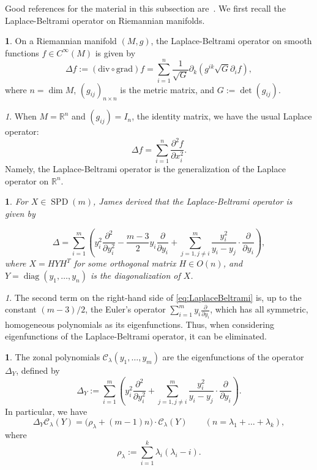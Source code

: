 \documentclass{mathincs}
\numberwithin{equation}{section}
\numberwithin{figure}{section}
\theoremstyle{plain}
\theoremstyle{definition}
\newtheorem{defn}[thm]{\protect\definitionname}
\theoremstyle{remark}
\newtheorem{rem}[thm]{\protect\remarkname}
\theoremstyle{plain}
\newtheorem{prop}[thm]{\protect\propositionname}
\theoremstyle{definition}
\theoremstyle{plain}
\theoremstyle{plain}
\DeclareMathOperator{\diag}{diag}
\newcommand{\SPD}{\operatorname{SPD}}
\providecommand{\definitionname}{Definition}
\providecommand{\propositionname}{Proposition}
\providecommand{\remarkname}{Remark}
\begin{document}
Good references for the material in this subsection are~\cite{Helgason,James1,Moakher}.
We first recall the Laplace-Beltrami operator on Riemannian manifolds.
\begin{defn}
On a Riemannian manifold $(M,g)$, the Laplace-Beltrami
operator on smooth functions $f\in C^{\infty}(M)$ is given by 
\[
\Delta f:=(\mathrm{div}\circ\mathrm{grad})f=\sum_{i=1}^{n}\frac{1}{\sqrt{G}}\partial_{k}\left(g^{ik}\sqrt{G}\partial_{i}f\right),
\]
where $n=\dim M$, $(g_{ij})_{n\times n}$ is the metric
matrix, and $G:=\det(g_{ij})$. 
\end{defn}
\begin{rem}
When $M=\mathbb{R}^{n}$ and $(g_{ij})=I_{n}$, the identity
matrix, we have the usual Laplace operator:
\[
\Delta f=\sum_{i=1}^{n}\frac{\partial^{2}f}{\partial x_{i}^{2}}.
\]
Namely, the Laplace-Beltrami operator is the generalization of the Laplace
operator on $\mathbb{R}^{n}$. 
\end{rem}
\begin{prop}
For $X\in \SPD(m)$, James \cite[eq.~3.12]{James1} derived
that the Laplace-Beltrami operator is given by

\begin{equation}
\Delta=\sum_{i=1}^{m}\left(y_{i}^{2}\frac{\partial^{2}}{\partial y_{i}^{2}}-\frac{m-3}{2}y_{i}\frac{\partial}{\partial y_{i}}+\sum_{j=1,j\neq i}^{m}\frac{y_{i}^{2}}{y_{i}-y_{j}}\cdot\frac{\partial}{\partial y_{i}}\right), \label{eq:LaplaceBeltrami}
\end{equation}
where $X=HY\!H^{T}$ for some orthogonal matrix $H\!\!\in\! O(n)$, and $Y\!\!=\!\diag(y_{1},\ldots,y_{n})$ is the diagonalization of $X$. 
\end{prop}
\begin{rem}
The second term on the right-hand side of \eqref{eq:LaplaceBeltrami} is, up to the constant $(m-3)/2$,
the Euler's operator $\sum_{i=1}^{m}y_{i}\frac{\partial}{\partial y_{i}}$,
which has all symmetric, homogeneous polynomials as its eigenfunctions.
Thus, when considering eigenfunctions of the Laplace-Beltrami operator,
it can be eliminated.
\end{rem}
\begin{defn}
The zonal polynomials $\mathcal{C}_{\lambda}(y_{1},\ldots,y_{m})$
are the eigenfunctions of the operator $\Delta_{Y}$, defined by
\[
  \Delta_{Y}:=\sum_{i=1}^{m}\left(y_{i}^{2}\frac{\partial^{2}}{\partial y_{i}^{2}}+\sum_{j=1,j\neq i}^{m}\frac{y_{i}^{2}}{y_{i}-y_{j}}\cdot\frac{\partial}{\partial y_{i}}\right).
\]
In particular, we have
\[
  \Delta_{Y}\mathcal{C}_{\lambda}(Y)=\bigl(\rho_{\lambda}+(m-1)n\bigr)\cdot\mathcal{C}_{\lambda}(Y)
  \qquad (n=\lambda_1+\dots+\lambda_k),
\]
where
\begin{equation}\label{eq:RHO}
  \rho_{\lambda}:=\sum_{i=1}^{k}\lambda_{i}\left(\lambda_{i}-i\right).
\end{equation}
\end{defn}
\end{document}

